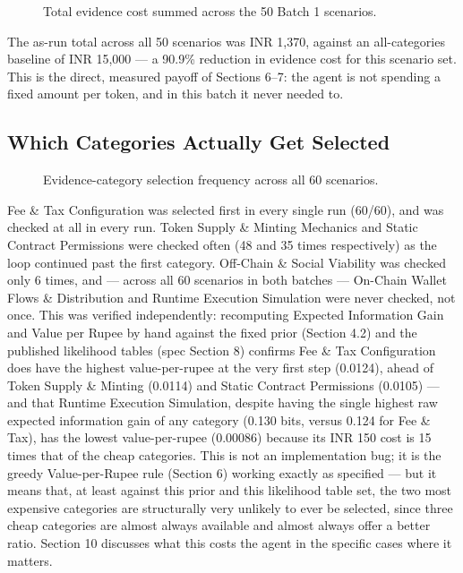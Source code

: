 \documentclass[11pt]{article}
\begin{document}
\begin{figure}[h]
\centering
{}
\caption{Total evidence cost summed across the 50 Batch 1 scenarios.}
\end{figure}

The as-run total across all 50 scenarios was INR 1,370, against an all-categories baseline of INR 15,000 --- a 90.9\% reduction in evidence cost for this scenario set. This is the direct, measured payoff of Sections 6--7: the agent is not spending a fixed amount per token, and in this batch it never needed to.

\subsection{Which Categories Actually Get Selected}

\begin{figure}[h]
\centering
{}
\caption{Evidence-category selection frequency across all 60 scenarios.}
\end{figure}

Fee \& Tax Configuration was selected first in every single run (60/60), and was checked at all in every run. Token Supply \& Minting Mechanics and Static Contract Permissions were checked often (48 and 35 times respectively) as the loop continued past the first category. Off-Chain \& Social Viability was checked only 6 times, and --- across all 60 scenarios in both batches --- On-Chain Wallet Flows \& Distribution and Runtime Execution Simulation were never checked, not once. This was verified independently: recomputing Expected Information Gain and Value per Rupee by hand against the fixed prior (Section 4.2) and the published likelihood tables (spec Section 8) confirms Fee \& Tax Configuration does have the highest value-per-rupee at the very first step (0.0124), ahead of Token Supply \& Minting (0.0114) and Static Contract Permissions (0.0105) --- and that Runtime Execution Simulation, despite having the single highest raw expected information gain of any category (0.130 bits, versus 0.124 for Fee \& Tax), has the lowest value-per-rupee (0.00086) because its INR 150 cost is 15 times that of the cheap categories. This is not an implementation bug; it is the greedy Value-per-Rupee rule (Section 6) working exactly as specified --- but it means that, at least against this prior and this likelihood table set, the two most expensive categories are structurally very unlikely to ever be selected, since three cheap categories are almost always available and almost always offer a better ratio. Section 10 discusses what this costs the agent in the specific cases where it matters.
\end{document}
